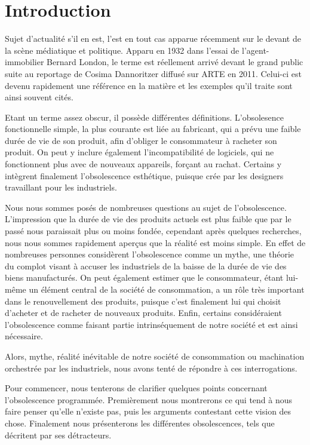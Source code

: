 \chapter*{Introduction}

Sujet d'actualité s'il en est, l'\op est en tout cas apparue récemment sur le devant de la scène médiatique et politique. Apparu en 1932 dans l'essai de l'agent-immobilier Bernard London, le terme est réellement arrivé devant le grand public suite au reportage de Cosima Dannoritzer diffusé sur ARTE en 2011. Celui-ci est devenu rapidement une référence en la matière et les exemples qu'il traite sont ainsi souvent cités.

Etant un terme assez obscur, il possède différentes définitions. L'obsolesence fonctionnelle simple, la plus courante est liée au fabricant, qui a prévu une faible durée de vie de son produit, afin d'obliger le consommateur à racheter son produit. On peut y inclure également l'incompatibilité de logiciels, qui ne fonctionnent plus avec de nouveaux appareils, forçant au rachat. Certains y intègrent finalement l'obsolescence esthétique, puisque crée par les designers travaillant pour les industriels.

Nous nous sommes posés de nombreuses questions au sujet de l'obsolescence. L'impression que la durée de vie des produits actuels est plus faible que par le passé nous paraissait plus ou moins fondée, cependant après quelques recherches, nous nous sommes rapidement aperçus que la réalité est moins simple. En effet de nombreuses personnes considèrent l'obsolescence comme un mythe, une théorie du complot visant à accuser les industriels de la baisse de la durée de vie des biens manufacturés. On peut également estimer que le consommateur, étant lui-même un élément central de la société de consommation, a un rôle très important dans le renouvellement des produits, puisque c'est finalement lui qui choisit d'acheter et de racheter de nouveaux produits. Enfin, certains considéraient l'obsolescence comme faisant partie intrinséquement de notre société et est ainsi nécessaire.

\medbreak Alors, mythe, réalité inévitable de notre société de consommation ou machination orchestrée par les industriels, nous avons tenté de répondre à ces interrogations.

\medbreak Pour commencer, nous tenterons de clarifier quelques points concernant l'obsolescence programmée. Premièrement nous montrerons ce qui tend à nous faire penser qu'elle n'existe pas, puis les arguments contestant cette vision des chose. Finalement nous présenterons les différentes obsolescences, tels que décritent par ses détracteurs.

